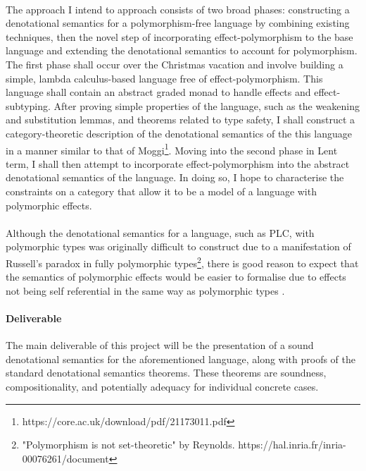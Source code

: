 \documentclass[11pt]{article}
\begin{document}
\paragraph{}{
The approach I intend to approach consists of two broad phases: constructing a denotational semantics for a polymorphism-free language by combining existing techniques, then the novel step of incorporating effect-polymorphism to the base language and extending the denotational semantics to account for polymorphism. The first phase shall occur over the Christmas vacation and involve building a simple, lambda calculus-based language free of effect-polymorphism. This language shall contain an abstract graded monad to handle effects and effect-subtyping. After proving simple properties of the language, such as the weakening and substitution lemmas, and theorems related to type safety, I shall construct a category-theoretic description of the denotational semantics of the this language in a manner similar to that of Moggi\footnote{https://core.ac.uk/download/pdf/21173011.pdf}. Moving into the second phase in Lent term, I shall then attempt to incorporate effect-polymorphism into the abstract denotational semantics of the language. In doing so, I hope to characterise the constraints on a category that allow it to be a model of a language with polymorphic effects.
}

\paragraph{}{
Although the denotational semantics for a language, such as PLC, with polymorphic types was originally difficult to construct due to a manifestation of Russell's paradox in fully polymorphic types\footnote{"Polymorphism
is not set-theoretic" by Reynolds. https://hal.inria.fr/inria-00076261/document}, there is good reason to expect that the semantics of polymorphic effects would be easier to formalise due to effects not being self referential in the same way as polymorphic types .
}




\paragraph{Deliverable}{
The main deliverable of this project will be the presentation of a sound denotational semantics for the aforementioned language, along with proofs of the standard denotational semantics theorems. These theorems are soundness, compositionality, and potentially adequacy for individual concrete cases.
}
\end{document}
